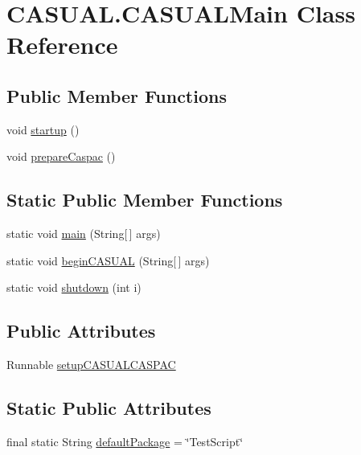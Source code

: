 \hypertarget{class_c_a_s_u_a_l_1_1_c_a_s_u_a_l_main}{\section{C\-A\-S\-U\-A\-L.\-C\-A\-S\-U\-A\-L\-Main Class Reference}
\label{class_c_a_s_u_a_l_1_1_c_a_s_u_a_l_main}
}
\subsection*{Public Member Functions}
\begin{DoxyCompactItemize}
\item 
void \hyperlink{class_c_a_s_u_a_l_1_1_c_a_s_u_a_l_main_aaef7dd1244b9d48e55da69f7a4a2bf32}{startup} ()
\item 
void \hyperlink{class_c_a_s_u_a_l_1_1_c_a_s_u_a_l_main_af8cb23fc7509a733dca74ee4787c5335}{prepare\-Caspac} ()
\end{DoxyCompactItemize}
\subsection*{Static Public Member Functions}
\begin{DoxyCompactItemize}
\item 
static void \hyperlink{class_c_a_s_u_a_l_1_1_c_a_s_u_a_l_main_a2d7f82ff2961d36d125005f65fdbcf0e}{main} (String\mbox{[}$\,$\mbox{]} args)
\item 
static void \hyperlink{class_c_a_s_u_a_l_1_1_c_a_s_u_a_l_main_a900f3a8c404f68d18d429a8b5ddc249a}{begin\-C\-A\-S\-U\-A\-L} (String\mbox{[}$\,$\mbox{]} args)
\item 
static void \hyperlink{class_c_a_s_u_a_l_1_1_c_a_s_u_a_l_main_aa8a10751e1501b7e2d9146554e4df252}{shutdown} (int i)
\end{DoxyCompactItemize}
\subsection*{Public Attributes}
\begin{DoxyCompactItemize}
\item 
Runnable \hyperlink{class_c_a_s_u_a_l_1_1_c_a_s_u_a_l_main_ac0104001f09bb1d16dea21e6146abb76}{setup\-C\-A\-S\-U\-A\-L\-C\-A\-S\-P\-A\-C}
\end{DoxyCompactItemize}
\subsection*{Static Public Attributes}
\begin{DoxyCompactItemize}
\item 
final static String \hyperlink{class_c_a_s_u_a_l_1_1_c_a_s_u_a_l_main_a388333cdd95aadbbee46efc43efea098}{default\-Package} = \char`\"{}Test\-Script\char`\"{}
\end{DoxyCompactItemize}


